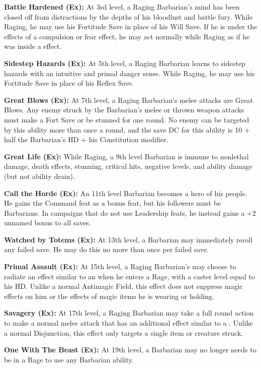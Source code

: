\textbf{Battle Hardened (Ex):} At 3rd level, a Raging Barbarian's mind has been closed off from distractions by the depths of his bloodlust and battle fury. While Raging, he may use his Fortitude Save in place of his Will Save. If he is under the effects of a compulsion or fear effect, he may act normally while Raging as if he was inside a  effect.

\textbf{Sidestep Hazards (Ex):} At 5th level, a Raging Barbarian learns to sidestep hazards with an intuitive and primal danger sense. While Raging, he may use his Fortitude Save in place of his Reflex Save.

\textbf{Great Blows (Ex):} At 7th level, a Raging Barbarian's melee attacks are Great Blows. Any enemy struck by the Barbarian's melee or thrown weapon attacks must make a Fort Save or be stunned for one round. No enemy can be targeted by this ability more than once a round, and the save DC for this ability is 10 + half the Barbarian's HD + his Constitution modifier.

\textbf{Great Life (Ex):} While Raging, a 9th level Barbarian is immune to nonlethal damage, death effects, stunning, critical hits, negative levels, and ability damage (but not ability drain).

\textbf{Call the Horde (Ex):} An 11th level Barbarian becomes a hero of his people. He gains the Command feat as a bonus feat, but his followers must be Barbarians. In campaigns that do not use Leadership feats, he instead gains a +2 unnamed bonus to all saves.

\textbf{Watched by Totems (Ex):} At 13th level, a Barbarian may immediately reroll any failed save. He may do this no more than once per failed save.

\textbf{Primal Assault (Ex):} At 15th level, a Raging Barbarian's may choose to radiate an effect similar to an  when he enters a Rage, with a caster level equal to his HD. Unlike a normal Antimagic Field, this effect does not suppress magic effects on him or the effects of magic items he is wearing or holding.

\textbf{Savagery (Ex):} At 17th level, a Raging Barbarian may take a full round action to make a normal melee attack that has an additional effect similar to a . Unlike a normal Disjunction, this effect only targets a single item or creature struck.

\textbf{One With The Beast (Ex):} At 19th level, a Barbarian may no longer needs to be in a Rage to use any Barbarian ability.
